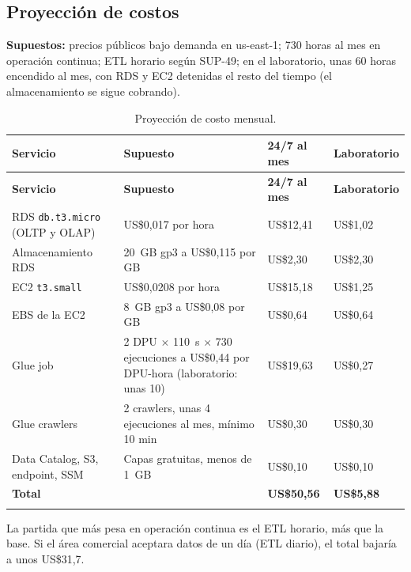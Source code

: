 \documentclass[10pt,letterpaper]{article}
\begin{document}
\subsection{Proyección de costos}
\textbf{Supuestos:} precios públicos bajo demanda en us-east-1; 730 horas al mes en operación continua; ETL horario según SUP-49; en el laboratorio, unas 60 horas encendido al mes, con RDS y EC2 detenidas el resto del tiempo (el almacenamiento se sigue cobrando).

\begin{longtable}{@{}L{3.6cm} L{6.0cm} R{2.4cm} R{2.6cm}@{}}
\toprule \textbf{Servicio} & \textbf{Supuesto} & \textbf{24/7 al mes} & \textbf{Laboratorio} \\ \midrule \endfirsthead
\toprule \textbf{Servicio} & \textbf{Supuesto} & \textbf{24/7 al mes} & \textbf{Laboratorio} \\ \midrule \endhead
RDS \texttt{db.t3.micro} (OLTP y OLAP) & US\$0,017 por hora & US\$12,41 & US\$1,02 \\
Almacenamiento RDS & 20~GB gp3 a US\$0,115 por GB & US\$2,30 & US\$2,30 \\
EC2 \texttt{t3.small} & US\$0,0208 por hora & US\$15,18 & US\$1,25 \\
EBS de la EC2 & 8~GB gp3 a US\$0,08 por GB & US\$0,64 & US\$0,64 \\
Glue job & 2 DPU $\times$ 110~s $\times$ 730 ejecuciones a US\$0,44 por DPU-hora (laboratorio: unas 10) & US\$19,63 & US\$0,27 \\
Glue crawlers & 2 crawlers, unas 4 ejecuciones al mes, mínimo 10 min & US\$0,30 & US\$0,30 \\
Data Catalog, S3, endpoint, SSM & Capas gratuitas, menos de 1~GB & US\$0,10 & US\$0,10 \\
\midrule
\textbf{Total} & & \textbf{US\$50,56} & \textbf{US\$5,88} \\
\bottomrule
\caption{Proyección de costo mensual.}
\end{longtable}

La partida que más pesa en operación continua es el ETL horario, más que la base. Si el área comercial aceptara datos de un día (ETL diario), el total bajaría a unos US\$31,7.
\end{document}
